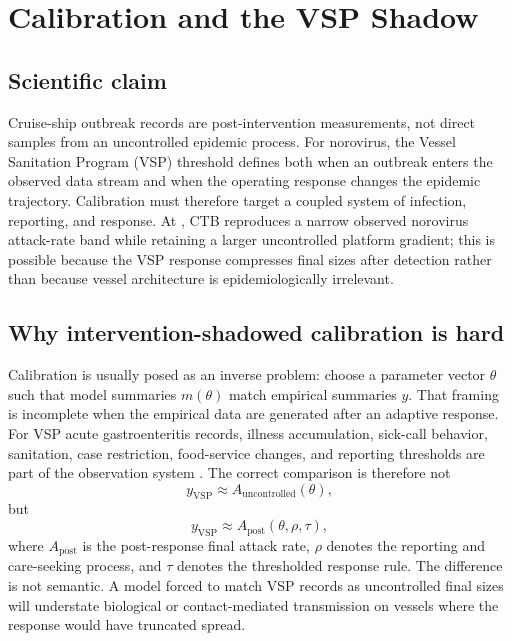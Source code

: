 \chapter{Calibration and the VSP Shadow}

\section{Scientific claim}
Cruise-ship outbreak records are post-intervention measurements, not direct samples from an uncontrolled epidemic
process. For norovirus, the Vessel Sanitation Program (VSP) threshold defines both when an outbreak enters the
observed data stream and when the operating response changes the epidemic trajectory. Calibration must therefore
target a coupled system of infection, reporting, and response. At , CTB reproduces a narrow observed
norovirus attack-rate band while retaining a larger uncontrolled platform gradient; this is possible because the
VSP response compresses final sizes after detection rather than because vessel architecture is epidemiologically
irrelevant.

\section{Why intervention-shadowed calibration is hard}
Calibration is usually posed as an inverse problem: choose a parameter vector \(\theta\) such that model summaries
\(m(\theta)\) match empirical summaries \(y\). That framing is incomplete when the empirical data are generated
after an adaptive response. For VSP acute gastroenteritis records, illness accumulation, sick-call behavior,
sanitation, case restriction, food-service changes, and reporting thresholds are part of the observation system
\citep{CDC_VSP2025,Cramer2004,Cramer2006,Freeland2016,Jenkins2021,Mouchtouri2024}.
The correct comparison is therefore not
\begin{equation}
  y_{\mathrm{VSP}} \approx A_{\mathrm{uncontrolled}}(\theta),
\end{equation}
but
\begin{equation}
  y_{\mathrm{VSP}} \approx A_{\mathrm{post}}(\theta,\rho,\tau),
\end{equation}
where \(A_{\mathrm{post}}\) is the post-response final attack rate, \(\rho\) denotes the reporting and care-seeking
process, and \(\tau\) denotes the thresholded response rule. The difference is not semantic. A model forced to
match VSP records as uncontrolled final sizes will understate biological or contact-mediated transmission on
vessels where the response would have truncated spread.

